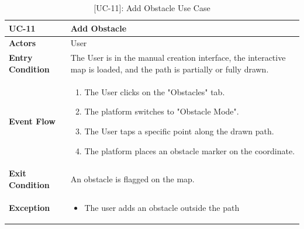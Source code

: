 \begin{table}[H]
    \centering
    \setlength\extrarowheight{2pt}
    \renewcommand{\arraystretch}{1.2}
    \begin{tabularx}{\textwidth}{|>{\bfseries}l|X|}
    \hline
    UC-11 & Add Obstacle \\ \hline
    Actors & User\\ \hline
    Entry Condition & The User is in the manual creation interface, the interactive map is loaded, and the path is partially or fully drawn.\\ \hline
    Event Flow & 
    \begin{enumerate}
      \item The User clicks on the "Obstacles" tab.
      \item The platform switches to "Obstacle Mode".
      \item The User taps a specific point along the drawn path.
      \item The platform places an obstacle marker on the coordinate.
    \end{enumerate}
    \\ \hline
    Exit Condition & An obstacle is flagged on the map.\\ \hline
    Exception & 
    \begin{itemize}
        \item The user adds an obstacle outside the path
    \end{itemize}
    \\ \hline
   \end{tabularx}
   \caption{[UC-11]: Add Obstacle Use Case}
    \label{UC-11}
\end{table}

